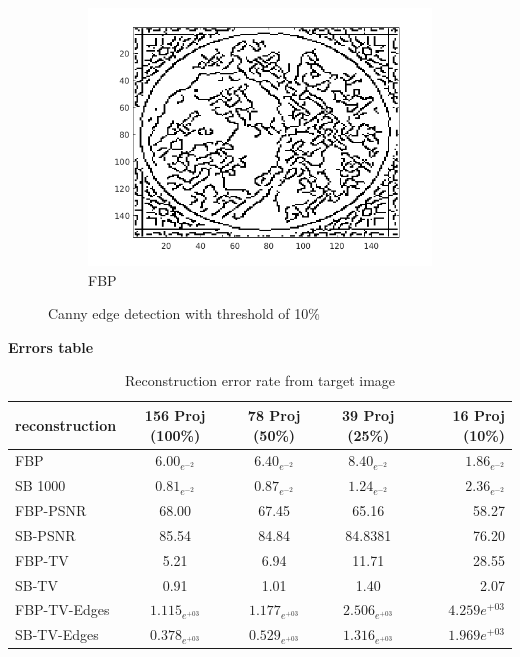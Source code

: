 \documentclass[10pt,a4paper,titlepage]{article}
\begin{document}
\begin{figure}[H]
\begin{subfigure}[b]{0.32\textwidth}
            	\centering 
            	\includegraphics[width=\textwidth]{Sample1/Edges/FBP/p4_0_10.png}
            	\caption{FBP}    
            	\label{subfig:FBP116p}
        	\end{subfigure}
       		
       		
       		
        	\caption{Canny edge detection with threshold of 10\%}
        	\label{fig:CannyT}
        	
    	\end{figure}
    	
\clearpage
		\textbf{Errors table}



		\begin{table}[H]
			\begin{tabular}{ | l || c | c | c | r | }
 				\hline			
   				reconstruction	& 156 Proj (100\%)	& 78 Proj (50\%)	& 39 Proj (25\%)	& 16 Proj (10\%)  \\
   				\hline
  				FBP			    &  $6.00_{e^{-2}}$	& $6.40_{e^{-2}}$	& $8.40_{e^{-2}}$	& $1.86_{e^{-2}}$\\
 				\hline  
 				SB 1000			&  $0.81_{e^{-2}}$  & $0.87_{e^{-2}}$ 	& $1.24_{e^{-2}}$ 	& $2.36_{e^{-2}}$\\
 				\hline 
 				\hline 
				FBP-PSNR		&  68.00			& 67.45				& 65.16				& 58.27\\
				\hline
				SB-PSNR			&  85.54			& 84.84				& 84.8381			& 76.20\\
				\hline
				\hline 
				FBP-TV			&  5.21				& 6.94				& 11.71				& 28.55\\
				\hline
				SB-TV			&  0.91				& 1.01				& 1.40				& 2.07\\
				\hline
				\hline
				FBP-TV-Edges	& $1.115_{e^{+03}}$	& $1.177_{e^{+03}}$	& $2.506_{e^{+03}}$ & $4.259{e^{+03}}$\\
				\hline
				SB-TV-Edges		& $0.378_{e^{+03}}$	& $0.529_{e^{+03}}$	& $1.316_{e^{+03}}$ & $1.969{e^{+03}}$\\
				\hline
								
 				
 			\end{tabular}
 			\caption{Reconstruction error rate from target image}
 			\label{tab:Error2000Sample1}
		\end{table}
		
\end{document}
